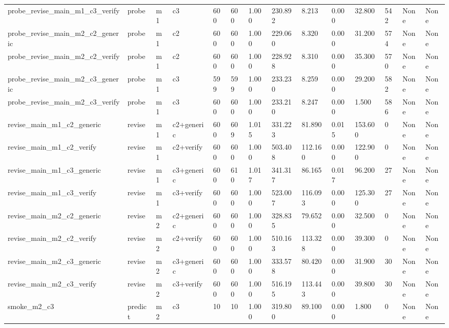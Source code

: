 \begin{tabular}{llllllllllllll}
probe\_revise\_main\_m1\_c3\_verify & probe & m1 & c3 & 600 & 600 & 1.000 & 230.892 & 8.213 & 0.000 & 32.800 & 542 & None & None \\
probe\_revise\_main\_m2\_c2\_generic & probe & m1 & c2 & 600 & 600 & 1.000 & 229.060 & 8.320 & 0.000 & 31.200 & 574 & None & None \\
probe\_revise\_main\_m2\_c2\_verify & probe & m1 & c2 & 600 & 600 & 1.000 & 228.928 & 8.310 & 0.000 & 35.300 & 570 & None & None \\
probe\_revise\_main\_m2\_c3\_generic & probe & m1 & c3 & 599 & 599 & 1.000 & 233.230 & 8.259 & 0.000 & 29.200 & 582 & None & None \\
probe\_revise\_main\_m2\_c3\_verify & probe & m1 & c3 & 600 & 600 & 1.000 & 233.210 & 8.247 & 0.000 & 1.500 & 586 & None & None \\
revise\_main\_m1\_c2\_generic & revise & m1 & c2+generic & 600 & 609 & 1.015 & 331.223 & 81.890 & 0.015 & 153.600 & 0 & None & None \\
revise\_main\_m1\_c2\_verify & revise & m1 & c2+verify & 600 & 600 & 1.000 & 503.408 & 112.160 & 0.000 & 122.900 & 0 & None & None \\
revise\_main\_m1\_c3\_generic & revise & m1 & c3+generic & 600 & 610 & 1.017 & 341.317 & 86.165 & 0.017 & 96.200 & 27 & None & None \\
revise\_main\_m1\_c3\_verify & revise & m1 & c3+verify & 600 & 600 & 1.000 & 523.007 & 116.093 & 0.000 & 125.300 & 27 & None & None \\
revise\_main\_m2\_c2\_generic & revise & m2 & c2+generic & 600 & 600 & 1.000 & 328.835 & 79.652 & 0.000 & 32.500 & 0 & None & None \\
revise\_main\_m2\_c2\_verify & revise & m2 & c2+verify & 600 & 600 & 1.000 & 510.163 & 113.328 & 0.000 & 39.300 & 0 & None & None \\
revise\_main\_m2\_c3\_generic & revise & m2 & c3+generic & 600 & 600 & 1.000 & 333.578 & 80.420 & 0.000 & 31.900 & 30 & None & None \\
revise\_main\_m2\_c3\_verify & revise & m2 & c3+verify & 600 & 600 & 1.000 & 516.195 & 113.443 & 0.000 & 39.800 & 30 & None & None \\
smoke\_m2\_c3 & predict & m2 & c3 & 10 & 10 & 1.000 & 319.800 & 89.100 & 0.000 & 1.800 & 0 & None & None \\
\bottomrule
\end{tabular}

